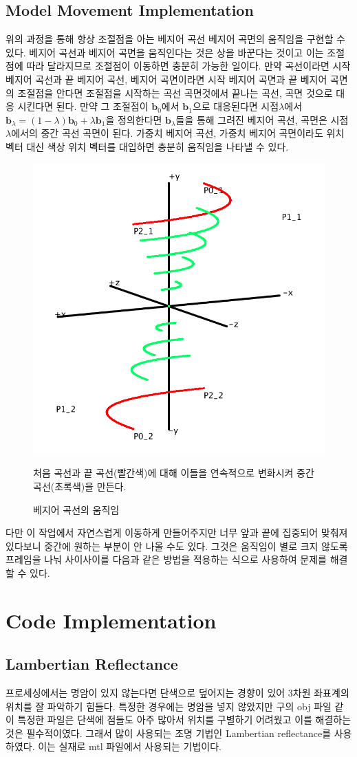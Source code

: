 \documentclass{gshs_thesis}
\theoremstyle{theorem}
\theoremstyle{lemma}
\theoremstyle{definition}
\begin{document}
\subsection{Model Movement Implementation}
위의 과정을 통해 항상 조절점을 아는 베지어 곡선 베지어 곡면의 움직임을 구현할 수 있다. 베지어 곡선과 베지어 곡면을 움직인다는 것은 상을 바꾼다는 것이고 이는 조절점에 따라 달라지므로 조절점이 이동하면 충분히 가능한 일이다. 만약 곡선이라면 시작 베지어 곡선과 끝 베지어 곡선, 베지어 곡면이라면 시작 베지어 곡면과 끝 베지어 곡면의 조절점을 안다면 조절점을 시작하는 곡선 곡면것에서 끝나는 곡선, 곡면 것으로 대응 시킨다면 된다. 만약 그 조절점이 $\textbf{b}_{0}$에서 $\textbf{b}_{1}$으로 대응된다면 시점$\lambda$에서 $\textbf{b}_{\lambda}=(1-\lambda)\textbf{b}_{0}+\lambda\textbf{b}_{1}$을 정의한다면 $\textbf{b}_{\lambda}$들을 통해 그려진 베지어 곡선, 곡면은 시점 $\lambda$에서의 중간 곡선 곡면이 된다. 가중치 베지어 곡선, 가중치 베지어 곡면이라도 위치 벡터 대신 색상 위치 벡터를 대입하면 충분히 움직임을 나타낼 수 있다. 

\begin{figure}[h]
	\centering
	\includegraphics[width=.4\textwidth]{image/BCmovement}
	\caption{베지어 곡선의 움직임}
	\small 처음 곡선과 끝 곡선(빨간색)에 대해 이들을 연속적으로 변화시켜 중간 곡선(초록색)을 만든다.
\end{figure}


다만 이 작업에서 자연스럽게 이동하게 만들어주지만 너무 앞과 끝에 집중되어 맞춰져 있다보니 중간에 원하는 부분이 안 나올 수도 있다. 그것은 움직임이 별로 크지 않도록 프레임을 나눠 사이사이를 다음과 같은 방법을 적용하는 식으로 사용하여 문제를 해결 할 수 있다.
\section{Code Implementation}
\subsection{Lambertian Reflectance} 
프로세싱에서는 명암이 있지 않는다면 단색으로 덮어지는 경향이 있어 3차원 좌표계의 위치를 잘 파악하기 힘들다. 특정한 경우에는 명암을 넣지 않았지만 구의 obj 파일 같이 특정한 파일은 단색에 점들도 아주 많아서 위치를 구별하기 어려웠고 이를 해결하는 것은 필수적이였다. 그래서 많이 사용되는 조명 기법인 Lambertian reflectance를 사용하였다. 이는 실재로 mtl 파일에서 사용되는 기법이다. 
\end{document}
